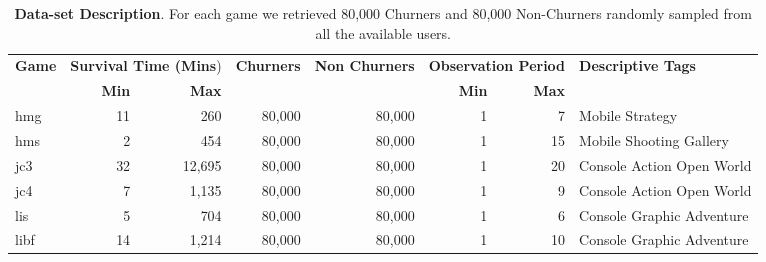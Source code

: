 \begin{table}[h] 
\centering
\caption{\textbf{Data-set Description}. For each game we retrieved 80,000 Churners and 80,000 Non-Churners randomly sampled from all the available users.}
\label{gamesdescription}
\begin{tabularx}{\textwidth}{@{}lrrrrrrX@{}}
\toprule

\multirow{2}{*}{\textbf{Game}} & \multicolumn{2}{l}{\textbf{Survival Time (Mins})} & \multirow{2}{*}{\textbf{Churners}} & \multirow{2}{*}{\textbf{Non Churners}} & \multicolumn{2}{l}{\textbf{Observation Period}} & \multirow{2}{*}{\textbf{Descriptive Tags}} \\ \cmidrule(lr){2-3} \cmidrule(lr){6-7}
                      & \textbf{Min}                  & \textbf{Max}                  &                           &                               & \textbf{Min}                & \textbf{Max}               &                                \\ \midrule
hmg                        & 11 & 260    & 80,000 & 80,000  & 1  & 7  & Mobile Strategy                       \\
hms                        & 2 & 454     & 80,000 & 80,000  & 1  & 15 & Mobile Shooting Gallery                \\
jc3                        & 32 & 12,695 & 80,000 & 80,000  & 1  & 20 & Console Action Open World             \\
jc4                        & 7 & 1,135   & 80,000 & 80,000  & 1  & 9  & Console Action Open World           \\
lis                        & 5 & 704     & 80,000 & 80,000  & 1  & 6  & Console Graphic Adventure \\
libf                       & 14 & 1,214  & 80,000 & 80,000  & 1  & 10 &  Console Graphic Adventure \\ \bottomrule
\end{tabularx}
\end{table}